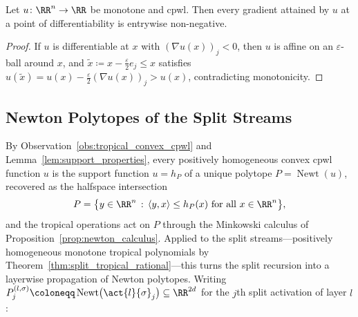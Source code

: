 \begin{theoremenv}\label{thm:monotone_nonneg_gradients}
Let $u \colon \RR^n \to \RR$ be monotone and \ac{cpwl}. Then every gradient attained by $u$ at a point of differentiability is entrywise non-negative.
\hfill{}
\end{theoremenv}

\begin{proof}
If $u$ is differentiable at $x$ with $(\nabla u(x))_j < 0$, then $u$ is affine on an $\varepsilon$-ball around $x$, and $\tilde{x} \coloneqq x - \tfrac{\varepsilon}{2} e_j \le x$ satisfies $u(\tilde{x}) = u(x) - \tfrac{\varepsilon}{2}(\nabla u(x))_j > u(x)$, contradicting monotonicity.
\end{proof}

\subsection{Newton Polytopes of the Split Streams}\label{sec:newton_polytopes_support}

By Observation~\ref{obs:tropical_convex_cpwl} and Lemma~\ref{lem:support_properties}, every positively homogeneous convex \ac{cpwl} function $u$ is the support function $u = h_P$ of a unique polytope $P = \operatorname{Newt}(u)$, recovered as the halfspace intersection
\begin{equation}
    P = \bigl\{ y \in \RR^n \, : \, \langle y, x \rangle \le h_P(x) \text{ for all } x \in \RR^n \bigr\},
    \label{eq:halfspace_description}
\end{equation}
and the tropical operations act on $P$ through the Minkowski calculus of Proposition~\ref{prop:newton_calculus}. Applied to the split streams---positively homogeneous monotone tropical polynomials by Theorem~\ref{thm:split_tropical_rational}---this turns the split recursion into a layerwise propagation of Newton polytopes. Writing $P^{(l,\sigma)}_j \coloneqq \operatorname{Newt}\bigl(\act{l}{\sigma}_j\bigr) \subseteq \RR^{2d}$ for the $j$th split activation of layer $l$:

